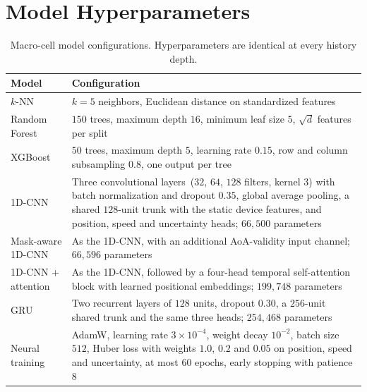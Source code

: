\section{Model Hyperparameters}
\label{app:hyperparameters}

\begin{table}[h]
  \centering
  \caption{Macro-cell model configurations. Hyperparameters are identical at every history depth.}
  \label{tab:hyperparameters}
  \small
  \begin{tabularx}{\textwidth}{@{}lX@{}}
    \toprule
    Model & Configuration \\
    \midrule
    $k$-NN & $k=5$ neighbors, Euclidean distance on standardized features \\
    Random Forest & $150$ trees, maximum depth $16$, minimum leaf size $5$, $\sqrt{d}$ features per split \\
    XGBoost & $50$ trees, maximum depth $5$, learning rate $0.15$, row and column subsampling $0.8$, one output per tree \\
    1D-CNN & Three convolutional layers~($32$, $64$, $128$ filters, kernel $3$) with batch normalization and dropout $0.35$, global average pooling, a shared $128$-unit trunk with the static device features, and position, speed and uncertainty heads; $66{,}500$ parameters \\
    Mask-aware 1D-CNN & As the 1D-CNN, with an additional AoA-validity input channel; $66{,}596$ parameters \\
    1D-CNN + attention & As the 1D-CNN, followed by a four-head temporal self-attention block with learned positional embeddings; $199{,}748$ parameters \\
    GRU & Two recurrent layers of $128$ units, dropout $0.30$, a $256$-unit shared trunk and the same three heads; $254{,}468$ parameters \\
    Neural training & AdamW, learning rate $3\times10^{-4}$, weight decay $10^{-2}$, batch size $512$, Huber loss with weights $1.0$, $0.2$ and $0.05$ on position, speed and uncertainty, at most $60$ epochs, early stopping with patience $8$ \\
    \bottomrule
  \end{tabularx}
\end{table}
